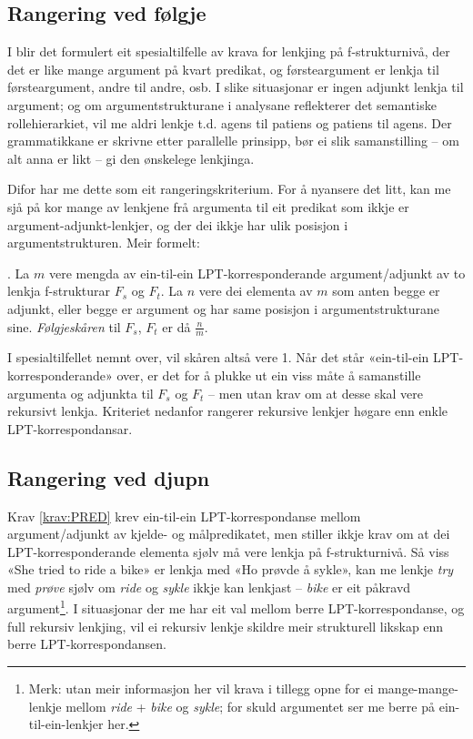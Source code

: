 \documentclass[11pt,a4paper,oneside,draft]{book}
\begin{document}
\subsection{Rangering ved følgje}
\label{sec-3.8.1}

I \citet[s.~75--76]{dyvik2009lmp} blir det formulert eit
spesialtilfelle av krava for lenkjing på f-strukturnivå, der det er
like mange argument på kvart predikat, og førsteargument er lenkja til
førsteargument, andre til andre, osb. I slike situasjonar er ingen
adjunkt lenkja til argument; og om argumentstrukturane i analysane
reflekterer det semantiske rollehierarkiet, vil me aldri lenkje
t.d. agens til patiens og patiens til agens. Der grammatikkane er
skrivne etter parallelle prinsipp, bør ei slik samanstilling -- om alt
anna er likt -- gi den ønskelege lenkjinga.

Difor har me dette som eit rangeringskriterium. For å nyansere det
litt, kan me sjå på kor mange av lenkjene frå argumenta til eit
predikat som ikkje er argument-adjunkt-lenkjer, og der dei ikkje har
ulik posisjon i argumentstrukturen. Meir formelt:

\ex. \label{krav:arg-order-rate} La $m$ vere mengda av ein-til-ein
     LPT-korresponderande argument/adjunkt av to lenkja f-strukturar
     $F_s$ og $F_t$. La $n$ vere dei elementa av $m$ som anten begge
     er adjunkt, eller begge er argument og har same posisjon i
     argumentstrukturane sine. \emph{Følgjeskåren} til $F_s$, $F_t$ er då
     $\frac{n}{m}$.

I spesialtilfellet nemnt over, vil skåren altså vere 1. Når det står
«ein-til-ein LPT-korresponderande» over, er det for å plukke ut ein
viss måte å samanstille argumenta og adjunkta til $F_s$ og $F_t$ --
men utan krav om at desse skal vere rekursivt lenkja. Kriteriet
nedanfor rangerer rekursive lenkjer høgare enn enkle
LPT-korrespondansar.

\subsection{Rangering ved djupn}
\label{sec-3.8.2}

Krav \ref{krav:PRED} krev ein-til-ein LPT-korrespondanse mellom
argument/adjunkt av kjelde- og målpredikatet, men stiller ikkje krav
om at dei LPT-korresponderande elementa sjølv må vere lenkja på
f-strukturnivå. Så viss «She tried to ride a bike» er lenkja med «Ho
prøvde å sykle», kan me lenkje \emph{try} med \emph{prøve} sjølv om \emph{ride} og
\emph{sykle} ikkje kan lenkjast -- \emph{bike} er eit påkravd argument\footnote{Merk: utan meir informasjon her vil krava i tillegg opne for
        ei mange-mange-lenkje mellom \emph{ride} + \emph{bike} og \emph{sykle}; for
        skuld argumentet ser me berre på ein-til-ein-lenkjer her. }. I
situasjonar der me har eit val mellom berre LPT-korrespondanse, og
full rekursiv lenkjing, vil ei rekursiv lenkje skildre meir
strukturell likskap enn berre LPT-korrespondansen.
\end{document}
